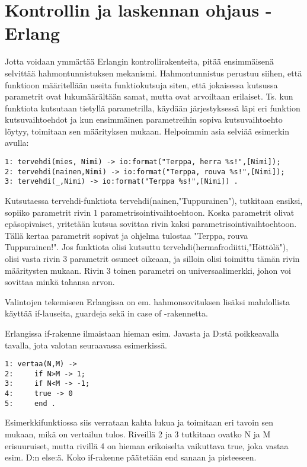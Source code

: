 \documentclass[11pt,oneside,a4paper]{article}
\begin{document}
\section{Kontrollin ja laskennan ohjaus - Erlang}
Jotta voidaan ymmärtää Erlangin kontrollirakenteita, pitää ensimmäisenä
selvittää hahmontunnistuksen mekanismi. Hahmontunnistus perustuu siihen, että
funktioon määritellään useita funktiokutsuja siten, että jokaisessa kutsussa
parametrit ovat lukumäärältään samat, mutta ovat arvoiltaan erilaiset. Ts. kun 
funktiota kutsutaan tietyllä parametrilla, käydään järjestyksessä läpi eri
funktion kutsuvaihtoehdot ja kun ensimmäinen parametreihin sopiva
kutsuvaihtoehto löytyy, 
toimitaan sen määrityksen mukaan. Helpoimmin asia selviää esimerkin avulla: 
\begin{verbatim}
1: tervehdi(mies, Nimi) -> io:format("Terppa, herra %s!",[Nimi]);
2: tervehdi(nainen,Nimi) -> io:format("Terppa, rouva %s!",[Nimi]);
3: tervehdi(_,Nimi) -> io:format("Terppa %s!",[Nimi]) . 
\end{verbatim}


Kutsutaessa tervehdi-funktiota tervehdi(nainen,"Tuppurainen"), tutkitaan
ensiksi, sopiiko parametrit  rivin 1 parametrisointivaihtoehtoon. Koska
parametrit olivat epäsopivaiset, 
yritetään kutsua sovittaa rivin kaksi parametrisointivaihtoehtoon. Tällä kertaa
parametrit sopivat ja ohjelma tulostaa "Terppa, rouva Tuppurainen!". Jos
funktiota olisi kutsuttu
tervehdi(hermafrodiitti,"Höttölä"), olisi vasta rivin 3 parametrit osuneet
oikeaan, ja silloin olisi toimittu tämän rivin määritysten mukaan. 
Rivin 3 toinen parametri on universaalimerkki, 
johon voi sovittaa minkä tahansa arvon.

Valintojen tekemiseen Erlangissa on em. hahmonsovituksen lisäksi mahdollista
käyttää if-lauseita, guardeja sekä in case of -rakennetta.

Erlangissa if-rakenne ilmaistaan hieman esim. Javasta ja D:stä poikkeavalla
tavalla, jota valotan seuraavassa esimerkissä. 

\begin{verbatim}
1: vertaa(N,M) -> 
2:     if N>M -> 1;
3:     if N<M -> -1;
4:     true -> 0
5:     end . 
\end{verbatim}

Esimerkkifunktiossa siis verrataan kahta lukua ja toimitaan eri tavoin sen
mukaan, mikä on vertailun tulos. Riveillä 2 ja 3 tutkitaan ovatko N ja M
erisuuruiset, mutta rivillä 4 on hieman erikoiselta
vaikuttava true, joka vastaa esim. D:n else:ä. Koko if-rakenne päätetään end
sanaan ja pisteeseen. 
\end{document}
